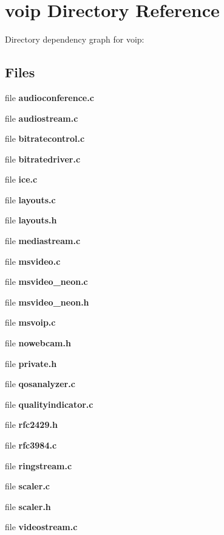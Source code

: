 \section{voip Directory Reference}
\label{dir_a30101da7247dde5ee29506ad34ceb36}
Directory dependency graph for voip\-:
\subsection*{Files}
\begin{DoxyCompactItemize}
\item 
file {\bfseries audioconference.\-c}
\item 
file {\bfseries audiostream.\-c}
\item 
file {\bfseries bitratecontrol.\-c}
\item 
file {\bfseries bitratedriver.\-c}
\item 
file {\bfseries ice.\-c}
\item 
file {\bfseries layouts.\-c}
\item 
file {\bfseries layouts.\-h}
\item 
file {\bfseries mediastream.\-c}
\item 
file {\bfseries msvideo.\-c}
\item 
file {\bfseries msvideo\-\_\-neon.\-c}
\item 
file {\bfseries msvideo\-\_\-neon.\-h}
\item 
file {\bfseries msvoip.\-c}
\item 
file {\bfseries nowebcam.\-h}
\item 
file {\bfseries private.\-h}
\item 
file {\bfseries qosanalyzer.\-c}
\item 
file {\bfseries qualityindicator.\-c}
\item 
file {\bfseries rfc2429.\-h}
\item 
file {\bfseries rfc3984.\-c}
\item 
file {\bfseries ringstream.\-c}
\item 
file {\bfseries scaler.\-c}
\item 
file {\bfseries scaler.\-h}
\item 
file {\bfseries videostream.\-c}
\end{DoxyCompactItemize}
